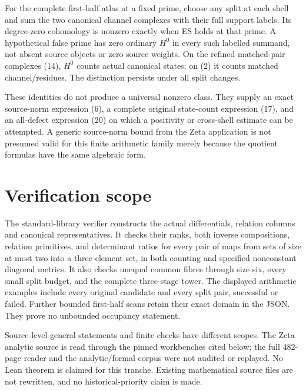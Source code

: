 For the complete first-half atlas at a fixed prime, choose any split at
each shell and sum the two canonical channel complexes with their full
support labels. Its degree-zero cohomology is nonzero exactly when ES
holds at that prime. A hypothetical false prime has zero ordinary
$H^0$ in every such labelled summand, not absent source objects or zero
source weights. On the refined matched-pair complexes (14), $H^0$ counts
actual canonical states; on (2) it counts matched channel/residues.
The distinction persists under all split changes.

These identities do not produce a universal nonzero class. They supply
an exact source-norm expression (6), a complete original state-count
expression (17), and an all-defect expression (20) on which a positivity
or cross-shell estimate can be attempted. A generic source-norm bound from
the Zeta application is not presumed valid for this finite arithmetic
family merely because the quotient formulas have the same algebraic form.

\section{Verification scope}
The standard-library verifier constructs the actual differentials, relation
columns and canonical representatives. It checks their ranks, both inverse
compositions, relation primitives, and determinant ratios for every pair
of maps from sets of size at most two into a three-element set, in both
counting and specified nonconstant diagonal metrics. It also checks unequal
common fibres through size six, every small split budget, and the complete
three-stage tower. The displayed arithmetic examples include every original
candidate and every split pair, successful or failed. Further bounded
first-half scans retain their exact domain in the JSON. They prove no
unbounded occupancy statement.

Source-level general statements and finite checks have different scopes.
The Zeta analytic source is read through the pinned workbenches cited below;
the full 482-page reader and the analytic/formal corpus were not audited or
replayed. No Lean theorem is claimed for this tranche. Existing mathematical
source files are not rewritten, and no historical-priority claim is made.
